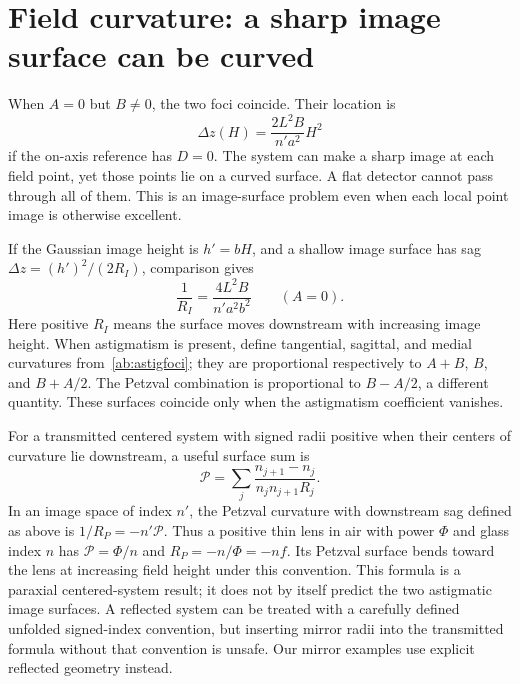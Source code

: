 \section{Field curvature: a sharp image surface can be curved}
When $A=0$ but $B\ne0$, the two foci coincide. Their location is
\begin{equation}
 \Delta z(H)=\frac{2L^2B}{n'a^2}H^2
\end{equation}
if the on-axis reference has $D=0$. The system can make a sharp image at each
field point, yet those points lie on a curved surface. A flat detector cannot
pass through all of them. This is an image-surface problem even when each
local point image is otherwise excellent.

If the Gaussian image height is $h'=bH$, and a shallow image surface has
sag $\Delta z=(h')^2/(2R_I)$, comparison gives
\begin{equation}
 \frac{1}{R_I}=\frac{4L^2B}{n'a^2b^2}
 \qquad(A=0).
\end{equation}
Here positive $R_I$ means the surface moves downstream with increasing
image height. When astigmatism is present, define tangential, sagittal, and
medial curvatures from~\eqref{ab:astigfoci}; they are proportional respectively
to $A+B$, $B$, and $B+A/2$. The Petzval combination is proportional to
$B-A/2$, a different quantity. These surfaces coincide only when the
astigmatism coefficient vanishes.

For a transmitted centered system with signed radii positive when their
centers of curvature lie downstream, a useful surface sum is
\begin{equation}
 \mathcal P=\sum_j\frac{n_{j+1}-n_j}{n_jn_{j+1}R_j}.
 \label{ab:petzvalsum}
\end{equation}
In an image space of index $n'$, the Petzval curvature with downstream sag
defined as above is $1/R_P=-n'\mathcal P$. Thus a positive thin lens in air
with power $\Phi$ and glass index $n$ has
$\mathcal P=\Phi/n$ and $R_P=-n/\Phi=-nf$. Its Petzval surface bends toward
the lens at increasing field height under this convention. This formula is
a paraxial centered-system result; it does not by itself predict the two
astigmatic image surfaces. A reflected system can be treated with a carefully
defined unfolded signed-index convention, but inserting mirror radii into
the transmitted formula without that convention is unsafe. Our mirror
examples use explicit reflected geometry instead.

